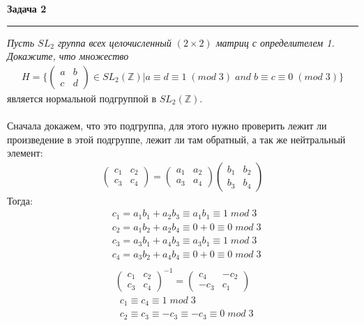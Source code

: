 \documentclass[a4paper,11pt]{article}
\begin{document}
\textbf{\large Задача 2}
\medskip\hrule\medskip
\textit{Пусть $ SL_2 $ группа всех целочисленный $ (2 \times 2) $ матриц с определителем 1. Докажите, что множество}
\begin{gather*}
H = \{ \begin{pmatrix}
a & b \\
c & d
\end{pmatrix} \in 
SL_2(\mathbb{Z}) | a \equiv d \equiv 1 \; (mod \; 3) \; and \; b \equiv c \equiv 0 \; (mod \; 3) \}
\end{gather*}
является нормальной подгруппой в $ SL_2(\mathbb{Z}) $. \\ \\
Сначала докажем, что это подгруппа, для этого нужно проверить лежит ли произведение в этой подгруппе, лежит ли там обратный, а так же нейтральный элемент:\\
\begin{gather*}
\begin{pmatrix}
c_1 & c_2 \\
c_3 & c_4
\end{pmatrix}
= 
\begin{pmatrix}
a_1 & a_2 \\
a_3 & a_4
\end{pmatrix}
\begin{pmatrix}
b_1 & b_2 \\
b_3 & b_4
\end{pmatrix}
\end{gather*}
Тогда:
\begin{align*}
&c_1 = a_1 b_1 + a_2 b_3 \equiv a_1b_1 \equiv 1 \; mod \; 3 \\
&c_2 = a_1 b_2 + a_2 b_4 \equiv 0 + 0 \equiv 0 \; mod \; 3 \\
&c_3 = a_3 b_1 + a_4 b_3 \equiv a_3b_1 \equiv 1 \; mod \; 3 \\ 
&c_4 = a_3 b_2 + a_4 b_4 \equiv 0 + 0 \equiv 0 \; mod \; 3 \\
\end{align*}
\begin{gather*}
\begin{pmatrix}
c_1 & c_2 \\
c_3 & c_4
\end{pmatrix}^{-1} = 
\begin{pmatrix}
c_4 & -c_2 \\
-c_3 & c_1
\end{pmatrix}
\end{gather*}
\begin{align*}
&c_1 \equiv c_4 \equiv 1 \; mod \; 3 \\
&c_2 \equiv c_3 \equiv -c_3 \equiv -c_3  \equiv 0 \; mod \; 3 \\
\end{align*}
\end{document}
